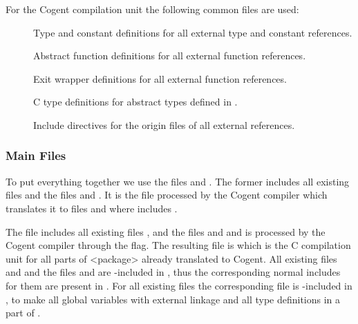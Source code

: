 For the Cogent compilation unit the following common files are used:
\begin{description}
\item[] Type and constant definitions for all external type and constant references.
\item[] Abstract function definitions for all external function references.
\item[] Exit wrapper definitions for all external function references.
\item[] C type definitions for abstract types defined in .
\item[] Include directives for the origin files of all external references.
\end{description}

\subsubsection{Main Files}

To put everything together we use the files  and . The former includes all 
existing  files and the files  and .
It is the file processed by the Cogent compiler which translates it to files  
and  where  includes . 

The file  includes all existing files 
, and the files  and  and is processed by the Cogent compiler through the 
 flag. The resulting file is  which is the C compilation unit for 
all parts of <package> already translated to Cogent. All existing files  and  
and the files  and  are 
-included in , thus the corresponding normal includes for them are present in 
.
For all existing files  the corresponding file  is -included in 
, to make all global variables with external linkage and all type definitions in  
a part of .

